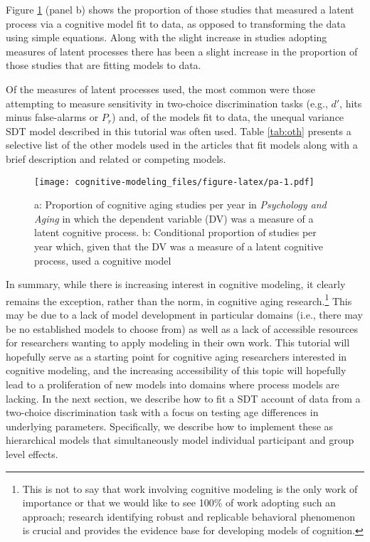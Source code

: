 \documentclass[
  english,
  ,man,floatsintext]{apa6}
\begin{document}
Figure \ref{fig:pa} (panel b) shows the proportion of those studies that measured a latent process via a cognitive model fit to data, as opposed to transforming the data using simple equations. Along with the slight increase in studies adopting measures of latent processes there has been a slight increase in the proportion of those studies that are fitting models to data.

Of the measures of latent processes used, the most common were those attempting to measure sensitivity in two-choice discrimination tasks (e.g., \(d'\), hits minus false-alarms or \(P_r\)) and, of the models fit to data, the unequal variance SDT model described in this tutorial was often used. Table \ref{tab:oth} presents a selective list of the other models used in the articles that fit models along with a brief description and related or competing models.

\begin{figure}
\centering
\texttt{[image: cognitive-modeling\_files/figure-latex/pa-1.pdf]}
\caption{\label{fig:pa}a: Proportion of cognitive aging studies per year in \emph{Psychology and Aging} in which the dependent variable (DV) was a measure of a latent cognitive process. b: Conditional proportion of studies per year which, given that the DV was a measure of a latent cognitive process, used a cognitive model}
\end{figure}

In summary, while there is increasing interest in cognitive modeling, it clearly remains the exception, rather than the norm, in cognitive aging research.\footnote{This is not to say that work involving cognitive modeling is the only work of importance or that we would like to see 100\% of work adopting such an approach; research identifying robust and replicable behavioral phenomenon is crucial and provides the evidence base for developing models of cognition.} This may be due to a lack of model development in particular domains (i.e., there may be no established models to choose from) as well as a lack of accessible resources for researchers wanting to apply modeling in their own work. This tutorial will hopefully serve as a starting point for cognitive aging researchers interested in cognitive modeling, and the increasing accessibility of this topic will hopefully lead to a proliferation of new models into domains where process models are lacking. In the next section, we describe how to fit a SDT account of data from a two-choice discrimination task with a focus on testing age differences in underlying parameters. Specifically, we describe how to implement these as hierarchical models that simultaneously model individual participant and group level effects.
\end{document}
